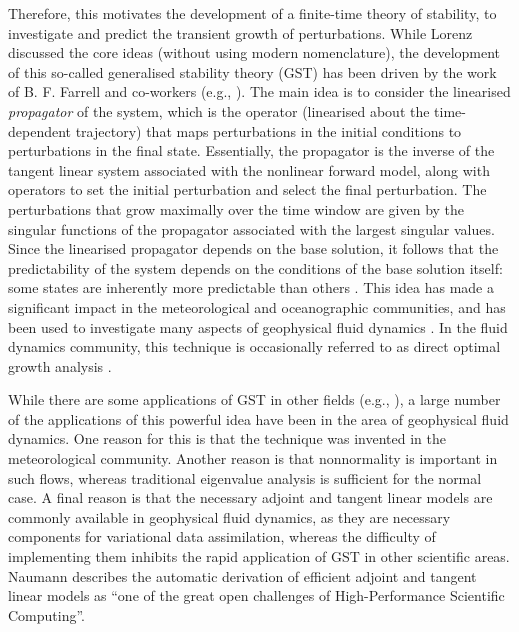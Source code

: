 \documentclass{siamltex}
\begin{document}
Therefore, this motivates the development of a finite-time theory of stability,
to investigate and predict the transient growth of perturbations. While Lorenz \cite{lorenz1965}
discussed the core ideas (without using modern nomenclature), the development of this
so-called generalised stability theory (GST) has been driven by the work of
B. F. Farrell and co-workers (e.g., \cite{farrell1982a,farrell1985,farrell1996,farrell1996b}). The main idea
is to consider the linearised \emph{propagator} of the system, which is the operator (linearised
about the time-dependent trajectory) that maps perturbations in the initial conditions
to perturbations in the final state. Essentially, the propagator is the inverse of the tangent linear system associated
with the nonlinear forward model, along with operators to set the initial perturbation and select the final perturbation. The perturbations that grow maximally over the
time window are given by the singular functions of the propagator associated with
the largest singular values. Since the linearised propagator depends on the
base solution, it follows that the predictability of the system depends on the conditions
of the base solution itself: some states are inherently more predictable than others \cite{lorenz1965,kalnay2002}.
This idea has made a significant impact in the meteorological and oceanographic communities, 
and has been used to investigate many aspects of geophysical fluid dynamics \cite{lorenz1965,farrell1982a,farrell1985,palmer1988,moore2004,zanna2011,zanna2011b}.
In the fluid dynamics community, this technique is occasionally referred to
as direct optimal growth analysis \cite{barkley2008}.

While there are some applications of GST in other fields (e.g., \cite{davis2005,mao2011}), a large
number of the applications of this powerful idea have been in the area of geophysical fluid
dynamics. One reason for this is that the technique was invented in the meteorological community.
Another reason is that nonnormality is important in such flows, whereas traditional eigenvalue
analysis is sufficient for the normal case.  A final reason is that the necessary adjoint and
tangent linear models are commonly available in geophysical fluid dynamics, as they are necessary
components for variational data assimilation, whereas the difficulty of implementing them inhibits
the rapid application of GST in other scientific areas. Naumann \cite{naumann2011} describes the automatic
derivation of efficient adjoint and tangent linear models as ``one of the great open challenges of
High-Performance Scientific Computing''.
\end{document}
